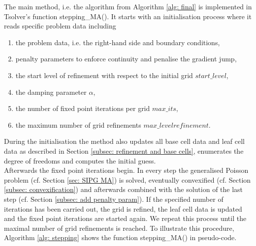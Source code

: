 The main method, i.e. the algorithm from Algorithm \ref{alg: final} is implemented in Tsolver's function stepping\_MA(). It starts with an initialisation process where it reads specific problem data including
\begin{enumerate}
 \item the problem data, i.e. the right-hand side and boundary conditions,
 \item penalty parameters to enforce continuity and penalise the gradient jump,
 \item the start level of refinement with respect to the initial grid $start\_level$,
 \item the damping parameter $\alpha$,
 \item the number of fixed point iterations per grid $max\_its$,
 \item the maximum number of grid refinements $max\_levelrefinement$.
\end{enumerate}
During the initialisation the method also updates all base cell data and leaf cell data as described in Section \ref{subsec: refinement and base cells}, enumerates the degree of freedoms and computes the initial guess.\\
Afterwards the fixed point iterations begin. In every step the generalised Poisson problem (cf. Section \ref{sec: SIPG MA}) is solved, eventually convexified (cf. Section \ref{subsec: convexification}) and afterwards combined with the solution of the last step (cf. Section \ref{subsec: add penalty param}). If the specified number of iterations has been carried out, the grid is refined, the leaf cell data is updated and the fixed point iterations are started again.
We repeat this process until the maximal number of grid refinements is reached.
To illustrate this procedure, Algorithm \ref{alg: stepping} shows the function stepping\_MA() in pseudo-code.
